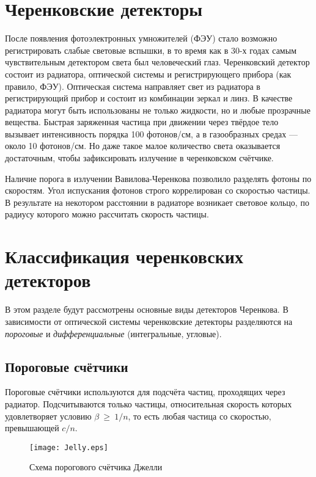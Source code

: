 \begin{main}
	\section{Черенковские детекторы}
	\label{sec:section}
	После появления фотоэлектронных умножителей (ФЭУ) стало возможно регистрировать слабые световые вспышки, в то время как в 30-х годах самым чувствительным детектором света был человеческий глаз.
	Черенковский детектор состоит из радиатора, оптической системы и регистрирующего прибора (как правило, ФЭУ).	
	Оптическая система направляет свет из радиатора в регистрирующий прибор и состоит из комбинации зеркал и линз. 
	В качестве радиатора могут быть использованы не только жидкости, но и любые прозрачные вещества.
	Быстрая заряженная частица при движении через твёрдое тело вызывает интенсивность порядка 100 фотонов/см, а в газообразных средах --- около 10 фотонов/см. Но даже такое малое количество света оказывается достаточным, чтобы зафиксировать излучение в черенковском счётчике. 
	
	Наличие порога в излучении Вавилова-Черенкова позволило разделять фотоны по скоростям.
	Угол испускания фотонов строго коррелирован со скоростью частицы. В результате на некотором расстоянии в радиаторе возникает световое кольцо, по радиусу которого можно рассчитать скорость частицы.
	
	\section{Классификация черенковских детекторов} 
	\label{sec:section}
	В этом разделе будут рассмотрены основные виды детекторов Черенкова. 
	В зависимости от оптической системы черенковские детекторы разделяются на  {\em пороговые} и {\em дифференциальные} (интегральные, угловые). 
	
	\subsection{Пороговые счётчики}
	\label{sec:subsection}
	Пороговые счётчики используются для подсчёта частиц, проходящих через радиатор. Подсчитываются только частицы, относительная скорость которых удовлетворяет условию $ \beta~\geq~1/n $, то есть любая частица со скоростью, превышающей $ c/n $.
	\begin{figure}
	
	\centering\texttt{[image: Jelly.eps]}
	\caption{Схема порогового счётчика Джелли} \label{Jelly-counter}
	\end{figure}


\end{main}
